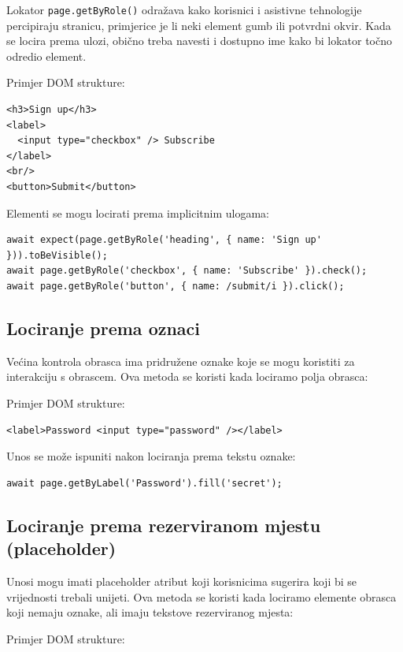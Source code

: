 Lokator \texttt{page.getByRole()} odražava kako korisnici i asistivne tehnologije percipiraju stranicu, primjerice je li neki element gumb ili potvrdni okvir.
Kada se locira prema ulozi, obično treba navesti i dostupno ime kako bi lokator točno odredio element.

Primjer DOM strukture:

\begin{verbatim}
<h3>Sign up</h3>
<label>
  <input type="checkbox" /> Subscribe
</label>
<br/>
<button>Submit</button>
\end{verbatim}

Elementi se mogu locirati prema implicitnim ulogama:

\begin{verbatim}
await expect(page.getByRole('heading', { name: 'Sign up' })).toBeVisible();
await page.getByRole('checkbox', { name: 'Subscribe' }).check();
await page.getByRole('button', { name: /submit/i }).click();
\end{verbatim}

\subsection*{Lociranje prema oznaci}

Većina kontrola obrasca ima pridružene oznake koje se mogu koristiti za interakciju s obrascem.
Ova metoda se koristi kada lociramo polja obrasca:

Primjer DOM strukture:
\begin{verbatim}
<label>Password <input type="password" /></label>
\end{verbatim}

Unos se može ispuniti nakon lociranja prema tekstu oznake:

\begin{verbatim}
await page.getByLabel('Password').fill('secret');
\end{verbatim}

\subsection*{Lociranje prema rezerviranom mjestu (placeholder)}

Unosi mogu imati placeholder atribut koji korisnicima sugerira koji bi se vrijednosti trebali unijeti.
Ova metoda se koristi kada lociramo elemente obrasca koji nemaju oznake, ali imaju tekstove rezerviranog mjesta:

Primjer DOM strukture:

